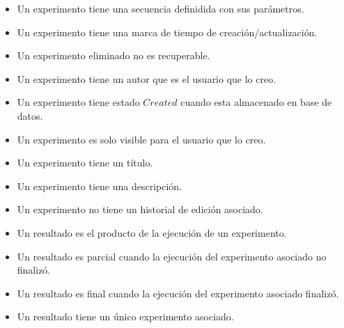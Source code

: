 \begin{itemize}
\item Un experimento tiene una secuencia definidida con sus par\'ametros.
\item Un experimento tiene una marca de tiempo de creaci\'on/actualizaci\'on.
\item Un experimento eliminado no es recuperable.
\item Un experimento tiene un autor que es el usuario que lo creo.
\item Un experimento tiene estado $Created$ cuando esta almacenado en base de datos.
\item Un experimento es solo visible para el usuario que lo creo.
\item Un experimento tiene un t\'itulo.
\item Un experimento tiene una descripci\'on.
\item Un experimento no tiene un historial de edici\'on asociado.
\end{itemize}

\begin{itemize}
\item Un resultado es el producto de la ejecuci\'on de un experimento.
\item Un resultado es parcial cuando la ejecuci\'on del experimento asociado no finaliz\'o.
\item Un resultado es final cuando la ejecuci\'on del experimento asociado finaliz\'o.
\item Un resultado tiene un \'unico experimento asociado.
\end{itemize}

